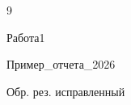 \begin{thebibliography}{9}

Работа1

Пример\_отчета\_2026

Обр. рез. исправленный

\end{thebibliography}